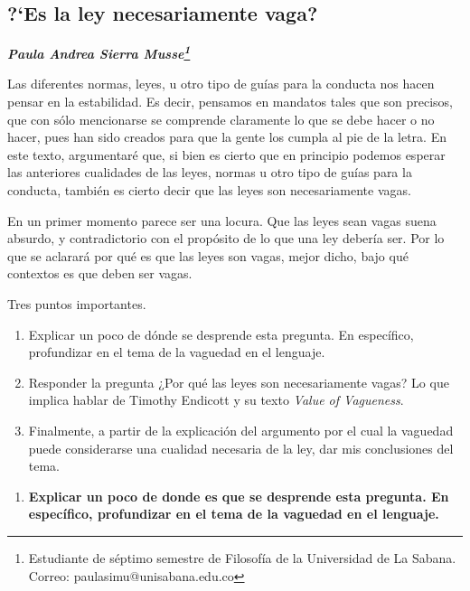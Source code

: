\documentclass[]{book}
\newcommand{\autor}[1]{            %
  \begin{center}                   %
    \vspace*{-3.5em}               %
    \textbf{\textit{\large #1}}    %
    \vspace*{+4em}                 %
  \end{center}
}
\begin{document}
\begin{refsection}
\chapter{\texorpdfstring{\textbf{?`Es la ley necesariamente
vaga?}}{?`Es la ley necesariamente vaga?}}\label{es-la-ley-necesariamente-vaga}

\autor{Paula Andrea Sierra Musse\footnote{Estudiante de séptimo
  semestre de Filosofía de la Universidad de La Sabana. Correo:
  paulasimu@unisabana.edu.co}}

Las diferentes normas, leyes, u otro tipo de guías para la conducta nos
hacen pensar en la estabilidad. Es decir, pensamos en mandatos tales que
son precisos, que con sólo mencionarse se comprende claramente lo que se
debe hacer o no hacer, pues han sido creados para que la gente los
cumpla al pie de la letra. En este texto, argumentaré que, si bien es
cierto que en principio podemos esperar las anteriores cualidades de las
leyes, normas u otro tipo de guías para la conducta, también es cierto
decir que las leyes son necesariamente vagas.

En un primer momento parece ser una locura. Que las leyes sean vagas
suena absurdo, y contradictorio con el propósito de lo que una ley
debería ser. Por lo que se aclarará por qué es que las leyes son vagas,
mejor dicho, bajo qué contextos es que deben ser vagas.

Tres puntos importantes.

\begin{enumerate}
\def\labelenumi{\arabic{enumi}.}
\item
  Explicar un poco de dónde se desprende esta pregunta. En específico,
  profundizar en el tema de la vaguedad en el lenguaje.
\item
  Responder la pregunta ¿Por qué las leyes son necesariamente vagas? Lo
  que implica hablar de Timothy Endicott y su texto \emph{Value of
  Vagueness}.
\item
  Finalmente, a partir de la explicación del argumento por el cual la
  vaguedad puede considerarse una cualidad necesaria de la ley, dar mis
  conclusiones del tema.
\end{enumerate}

\begin{enumerate}
\def\labelenumi{\arabic{enumi}.}
\item
  \textbf{Explicar un poco de donde es que se desprende esta pregunta.
  En específico, profundizar en el tema de la vaguedad en el lenguaje.}
\end{enumerate}


\end{refsection}
\end{document}
